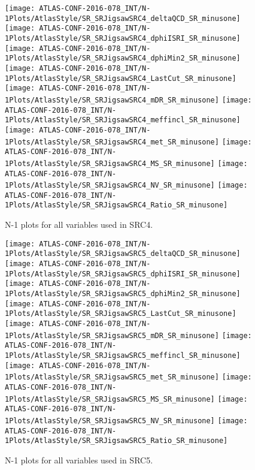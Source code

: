\begin{figure}[tbp]
\begin{center}
\texttt{[image: ATLAS-CONF-2016-078\_INT/N-1Plots/AtlasStyle/SR\_SRJigsawSRC4\_deltaQCD\_SR\_minusone]}
\texttt{[image: ATLAS-CONF-2016-078\_INT/N-1Plots/AtlasStyle/SR\_SRJigsawSRC4\_dphiISRI\_SR\_minusone]}
\texttt{[image: ATLAS-CONF-2016-078\_INT/N-1Plots/AtlasStyle/SR\_SRJigsawSRC4\_dphiMin2\_SR\_minusone]}
\texttt{[image: ATLAS-CONF-2016-078\_INT/N-1Plots/AtlasStyle/SR\_SRJigsawSRC4\_LastCut\_SR\_minusone]}
\texttt{[image: ATLAS-CONF-2016-078\_INT/N-1Plots/AtlasStyle/SR\_SRJigsawSRC4\_mDR\_SR\_minusone]}
\texttt{[image: ATLAS-CONF-2016-078\_INT/N-1Plots/AtlasStyle/SR\_SRJigsawSRC4\_meffincl\_SR\_minusone]}
\texttt{[image: ATLAS-CONF-2016-078\_INT/N-1Plots/AtlasStyle/SR\_SRJigsawSRC4\_met\_SR\_minusone]}
\texttt{[image: ATLAS-CONF-2016-078\_INT/N-1Plots/AtlasStyle/SR\_SRJigsawSRC4\_MS\_SR\_minusone]}
\texttt{[image: ATLAS-CONF-2016-078\_INT/N-1Plots/AtlasStyle/SR\_SRJigsawSRC4\_NV\_SR\_minusone]}
\texttt{[image: ATLAS-CONF-2016-078\_INT/N-1Plots/AtlasStyle/SR\_SRJigsawSRC4\_Ratio\_SR\_minusone]}
\end{center}
\caption{N-1 plots for all variables used in SRC4.}
\label{fig:SR_SRJigsawSRC4_deltaQCD_SR_minusone}
\end{figure}

\clearpage
\begin{figure}[tbp]
\begin{center}
\texttt{[image: ATLAS-CONF-2016-078\_INT/N-1Plots/AtlasStyle/SR\_SRJigsawSRC5\_deltaQCD\_SR\_minusone]}
\texttt{[image: ATLAS-CONF-2016-078\_INT/N-1Plots/AtlasStyle/SR\_SRJigsawSRC5\_dphiISRI\_SR\_minusone]}
\texttt{[image: ATLAS-CONF-2016-078\_INT/N-1Plots/AtlasStyle/SR\_SRJigsawSRC5\_dphiMin2\_SR\_minusone]}
\texttt{[image: ATLAS-CONF-2016-078\_INT/N-1Plots/AtlasStyle/SR\_SRJigsawSRC5\_LastCut\_SR\_minusone]}
\texttt{[image: ATLAS-CONF-2016-078\_INT/N-1Plots/AtlasStyle/SR\_SRJigsawSRC5\_mDR\_SR\_minusone]}
\texttt{[image: ATLAS-CONF-2016-078\_INT/N-1Plots/AtlasStyle/SR\_SRJigsawSRC5\_meffincl\_SR\_minusone]}
\texttt{[image: ATLAS-CONF-2016-078\_INT/N-1Plots/AtlasStyle/SR\_SRJigsawSRC5\_met\_SR\_minusone]}
\texttt{[image: ATLAS-CONF-2016-078\_INT/N-1Plots/AtlasStyle/SR\_SRJigsawSRC5\_MS\_SR\_minusone]}
\texttt{[image: ATLAS-CONF-2016-078\_INT/N-1Plots/AtlasStyle/SR\_SRJigsawSRC5\_NV\_SR\_minusone]}
\texttt{[image: ATLAS-CONF-2016-078\_INT/N-1Plots/AtlasStyle/SR\_SRJigsawSRC5\_Ratio\_SR\_minusone]}
\end{center}
\caption{N-1 plots for all variables used in SRC5.}
\label{fig:SR_SRJigsawSRC5_dphiMin2_SR_minusone}
\end{figure}
\clearpage

